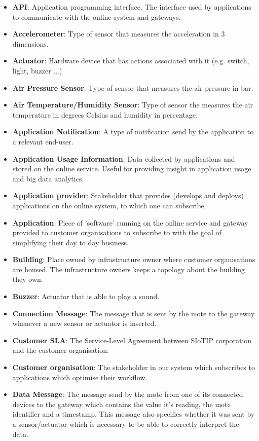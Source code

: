 \begin{itemize}
	\item \textbf{API}: Application programming interface. The interface used by applications to communicate with the online system and gateways.
	\item \textbf{Accelerometer}: Type of sensor that measures the acceleration in 3 dimensions.
	\item \textbf{Actuator}: Hardware device that has actions associated with it (e.g. switch, light, buzzer ...)
	\item \textbf{Air Pressure Sensor}: Type of sensor that measures the air pressure in bar.
	\item \textbf{Air Temperature/Humidity Sensor}: Type of sensor the measures the air temperature in degrees Celsius and humidity in percentage.
	\item \textbf{Application Notification}: A type of notification send by the application to a relevant end-user.
	\item \textbf{Application Usage Information}: Data collected by applications and stored on the online service. Useful for providing insight in application usage and big data analytics.
	\item \textbf{Application provider}: Stakeholder that provides (develops and deploys) applications on the online system, to which one can subscribe.
	\item \textbf{Application}: Piece of 'software' running on the online service and gateway provided to customer organisations to subscribe to with the goal of simplifying their day to day business.
	\item \textbf{Building}: Place owned by infrastructure owner where customer organisations are housed. The infrastructure owners keeps a topology about the building they own.
	\item \textbf{Buzzer}: Actuator that is able to play a sound.
	\item \textbf{Connection Message}: The message that is sent by the mote to the gateway whenever a new sensor or actuator is inserted.
	\item \textbf{Customer SLA}: The Service-Level Agreement between SIoTIP corporation and the customer organisation.
	\item \textbf{Customer organisation}: The stakeholder in our system which subscribes to applications which optimise their workflow.
	\item \textbf{Data Message}: The message send by the mote from one of its connected devices to the gateway which contains the value it's reading, the mote identifier and a timestamp. This message also specifies whether it was sent by a sensor/actuator which is necessary to be able to correctly interpret the data.

\end{itemize}
